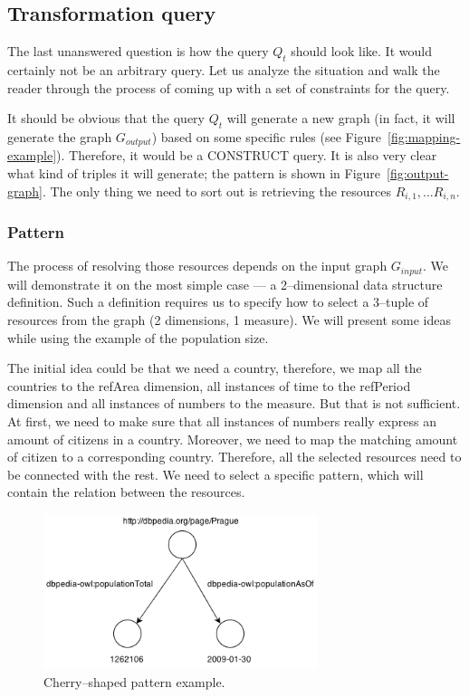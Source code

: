 \subsection{Transformation query}

The last unanswered question is how the query $Q_t$ should look like. 
It would certainly not be an arbitrary query. Let us analyze the situation and 
walk the reader through the process of coming up with a set of constraints for the 
query.

It should be obvious that the query $Q_t$ will generate a new graph
(in fact, it will generate the graph $G_{output}$) based on some specific rules
(see Figure~\ref{fig:mapping-example}). 
Therefore, it would be a CONSTRUCT query. It is also very clear what kind of 
triples it will generate; the pattern is shown in Figure~\ref{fig:output-graph}.
The only thing we need to sort out is retrieving the resources $R_{i,1}, ... R_{i,n}$.

\subsubsection{Pattern}
The process of resolving those resources depends on the input graph $G_{input}$.
We will demonstrate it on the most simple case --- a 2--dimensional data structure 
definition. Such a definition requires us to specify how to select a 3--tuple of resources from 
the graph (2 dimensions, 1 measure).
We will present some ideas while using the example of the population size.

The initial idea could be that we need a country, therefore, we map all the 
countries to the refArea dimension, all instances of time to the refPeriod 
dimension and all instances of numbers to the measure. But that is not sufficient. At first, we need to make sure that all instances of numbers 
really express an amount of citizens in a country. Moreover, we need to map the
matching amount of citizen to a corresponding country. Therefore, all the 
selected resources need to be connected with the rest. We need to select a 
specific pattern, which will contain the relation between the resources.

\begin{figure}
	\centering
	\includegraphics[width=80mm]{images/cherry.png}
	\caption{Cherry--shaped pattern example.}
	\label{fig:cherry}
\end{figure}

